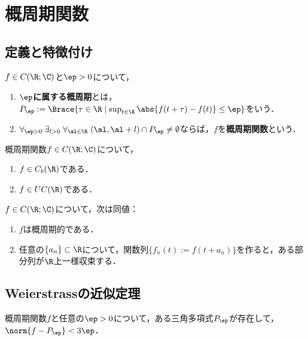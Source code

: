 \documentclass[uplatex,dvipdfmx]{jsreport}
\begin{document}
\section{概周期関数}

\subsection{定義と特徴付け}

\begin{definition}
    $f\in C(\R;\C)$と$\ep>0$について，
    \begin{enumerate}
        \item \textbf{$\ep$に属する概周期}とは，$P_\ep:=\Brace{\tau\in\R\mid\sup_{t\in\R}\abs{f(t+\tau)-f(t)}\le\ep}$をいう．
        \item $\forall_{\ep>0}\;\exists_{l>0}\;\forall_{\al\in\R}\;(\al,\al+l)\cap P_\ep\ne\emptyset$ならば，$f$を\textbf{概周期関数}という．
    \end{enumerate}
\end{definition}

\begin{theorem}
    概周期関数$f\in C(\R;\C)$について，
    \begin{enumerate}
        \item $f\in C_b(\R)$である．
        \item $f\in UC(\R)$である．
    \end{enumerate}
\end{theorem}

\begin{theorem}
    $f\in C(\R;\C)$について，次は同値：
    \begin{enumerate}
        \item $f$は概周期的である．
        \item 任意の$\{a_n\}\subset\R$について，関数列$\{f_n(t):=f(t+a_n)\}$を作ると，ある部分列が$\R$上一様収束する．
    \end{enumerate}
\end{theorem}

\subsection{Weierstrassの近似定理}

\begin{theorem}
    概周期関数$f$と任意の$\ep>0$について，ある三角多項式$P_\ep$が存在して，$\norm{f-P_\ep}<3\ep$．
\end{theorem}
\end{document}
